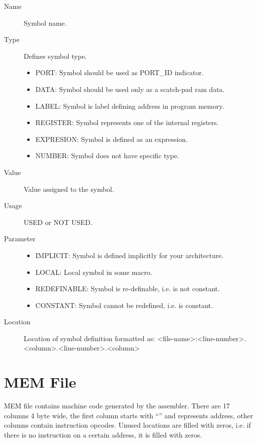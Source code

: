     \begin{description}
        \item[Name]
            Symbol name.

        \item[Type]
            Defines symbol type.
            \begin{itemize}
                \item PORT: Symbol should be used as PORT\_ID indicator.
                \item DATA: Symbol should be used only as a scatch-pad ram data.
                \item LABEL: Symbol is label defining address in program memory.
                \item REGISTER: Symbol represents one of the internal registers.
                \item EXPRESION: Symbol is defined as an expression.
                \item NUMBER: Symbol does not have specific type.
            \end{itemize}

        \item[Value]
            Value assigned to the symbol.

        \item[Usage]
            USED or NOT USED.

        \item[Parameter]
            \begin{itemize}
                \item IMPLICIT: Symbol is defined implicitly for your architecture.
                \item LOCAL: Local symbol in some macro.
                \item REDEFINABLE: Symbol is re-definable, i.e. is not constant.
                \item CONSTANT: Symbol cannot be redefined, i.e. is constant.
            \end{itemize}

        \item[Location]
            Location of symbol definition formatted as: <file-name>:<line-number>.<column>.<line-number>.<column>
    \end{description}

\clearpage
\section{MEM File}
    MEM file contains machine code generated by the assembler. There are 17 columns 4 byte wide, the first column starts with ``\@'' and represents address, other columns contain instruction opcodes. Unused locations are filled with zeros, i.e. if there is no instruction on a certain address, it is filled with zeros.

